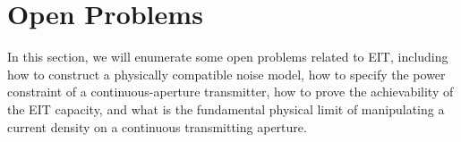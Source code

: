 \documentclass[journal,twocolumn]{IEEEtran}
\begin{document}



\section{Open Problems}
In this section, we will enumerate some open problems related to EIT, including how to construct a physically compatible noise model, how to specify the power constraint of a continuous-aperture transmitter, how to prove the achievability of the EIT capacity, and what is the fundamental physical limit of manipulating a current density on a continuous transmitting aperture. 
\end{document}
